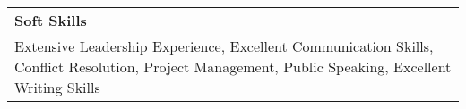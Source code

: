 \documentclass[10pt, letterpaper]{article}
\newcommand{\tabularxwidth}{\textwidth}
\begin{document}
        
            \vspace{.5em}
        

    
        \begin{tabularx}{\tabularxwidth}{X}
            \textbf{Soft Skills} \\
            
            Extensive Leadership Experience, 
            Excellent Communication Skills, 
            Conflict Resolution, 
            Project Management, 
            Public Speaking, 
            Excellent Writing Skills \\
        \end{tabularx}

        

    
\end{document}
